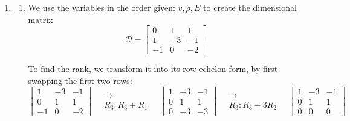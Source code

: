 \begin{enumerate}
%
%
%
%
%
%




\newpage


\item 
\begin{enumerate}

	\item We use the variables in the order given: $v, \rho, E$ to create the dimensional matrix
	\[ \mathcal{D} = 
	\begin{bmatrix}
		0	& 1		& 1 		\\
		1	& -3	& -1 	\\
		-1	& 0		& -2
	\end{bmatrix}
	\]
	
	To find the rank, we transform it into its row echelon form, by first swapping the first two rows:
	\[
	\begin{bmatrix}
		1	& -3	& -1 	\\
		0	& 1		& 1 		\\
		-1	& 0		& -2
	\end{bmatrix}
	\quad \substack{\longrightarrow \\ R_3: R_3+R_1} \quad
		\begin{bmatrix}
			1	& -3	& -1 	\\
			0	& 1		& 1 		\\
			0	& -3		& -3
		\end{bmatrix}
	\quad \substack{\longrightarrow \\ R_3: R_3+3R_2} \quad
		\begin{bmatrix}
			1	& -3	& -1 	\\
			0	& 1		& 1 		\\
			0	& 0		& 0
		\end{bmatrix}
	\]
	

\end{enumerate}
\end{enumerate}
